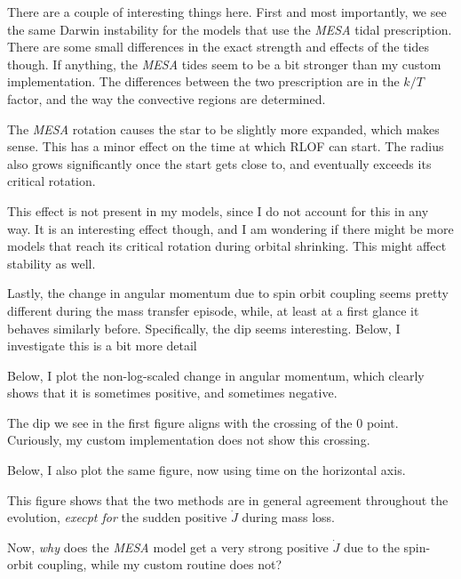 \documentclass[a4paper,10pt]{article}
\begin{document}
There are a couple of interesting things here. First and most importantly, we see the same Darwin instability for the models that use the \emph{MESA} tidal prescription.
There are some small differences in the exact strength and effects of the tides though. If anything, the \emph{MESA} tides seem to be a bit stronger than my custom implementation. The differences between the two prescription are in the \(k / T\) factor, and the way the convective regions are determined. 

The \emph{MESA} rotation causes the star to be slightly more expanded, which makes sense. This has a minor effect on the time at which RLOF can start. The radius also grows significantly once the start gets close to, and eventually exceeds its critical rotation.

This effect is not present in my models, since I do not account for this in any way. It is an interesting effect though, and I am wondering if there might be more models that reach its critical rotation during orbital shrinking. This might affect stability as well.

Lastly, the change in angular momentum due to spin orbit coupling seems pretty different during the mass transfer episode, while, at least at a first glance it behaves similarly before. Specifically, the dip seems interesting. Below, I investigate this is a bit more detail

Below, I plot the non-log-scaled change in angular momentum, which clearly shows that it is sometimes positive, and sometimes negative. 
\begin{figure}[ht]
    \centering
\end{figure}

The dip we see in the first figure aligns with the crossing of the \(0\) point. Curiously, my custom implementation does not show this crossing.

Below, I also plot the same figure, now using time on the horizontal axis.

\begin{figure}[ht]
    \centering
\end{figure}

This figure shows that the two methods are in general agreement throughout the evolution, \emph{execpt for} the sudden positive \(\dot{J}   \) during mass loss. 

\nextpage
Now, \emph{why} does the \emph{MESA} model get a very strong positive \(\dot{J} \) due to the spin-orbit coupling, while my custom routine does not?
\end{document}
